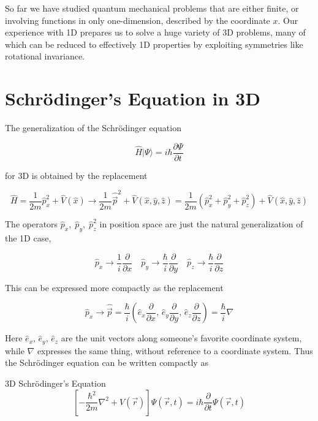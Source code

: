 
So far we have studied quantum mechanical problems that are either finite, or
involving functions in only one-dimension, described by the coordinate $x$. Our experience with 1D prepares us to solve a huge variety of 3D problems, many
of which can be reduced to effectively 1D properties by exploiting symmetries
like rotational invariance. 

\section{Schr\"odinger's Equation in 3D}

The generalization of the Schr\"odinger equation 

\[
\hat{H} | \Psi \rangle = i\hbar \frac{\partial \Psi}{\partial t} 
\] \vspace{3px}


for 3D is obtained by the replacement 

\[
\hat{H} = \frac{1}{2m} \hat{p}_x^2 + \hat{V}(\hat{x}) \rightarrow \frac{1}{2m}
\hat{\vec{p}}^2 + \hat{V}(\hat{x}, \hat{y}, \hat{z}) = \frac{1}{2m}
(\hat{p}_x^2 + \hat{p}_y^2 + \hat{p}_z^2) + \hat{V}(\hat{x}, \hat{y}, \hat{z})
\] \vspace{3px}

The operators $\hat{p}_x, \; \hat{p}_y, \; \hat{p}_z^2$ in position space are
just the natural generalization of the 1D case, 

\[
\hat{p}_x \rightarrow \frac{1}{i} \frac{\partial }{\partial x} \quad \hat{p}_y
\rightarrow \frac{\hbar}{i} \frac{\partial }{\partial y} \quad \hat{p}_z
\rightarrow \frac{\hbar}{i} \frac{\partial }{\partial z} 
\] \vspace{3px}

This can be expressed more compactly as the replacement

\[
\hat{p}_x \rightarrow \hat{\vec{p}} = \frac{\hbar}{i} \left( \hat{e}_x
\frac{\partial }{\partial x} , \, \hat{e}_y \frac{\partial }{\partial y} , \,
\hat{e}_z \frac{\partial }{\partial z}  \right)  = \frac{\hbar}{i} \nabla
\] \vspace{3px}

Here $\hat{e}_x, \, \hat{e}_y, \, \hat{e}_z$ are the unit vectors along
someone's favorite coordinate system, while $\nabla$ expresses the same thing,
without reference to a coordinate system. Thus the Schr\"odinger equation can
be written compactly as  

\begin{subbox}{3D Schr\"odinger's Equation}
  \[\left[ -\frac{\hbar^2}{2m} \nabla^2 + V(\vec{r}) \right] \Psi(\vec{r}, t)
  = i\hbar \frac{\partial }{\partial t} \Psi(\vec{r}, t) \] 
\end{subbox}

